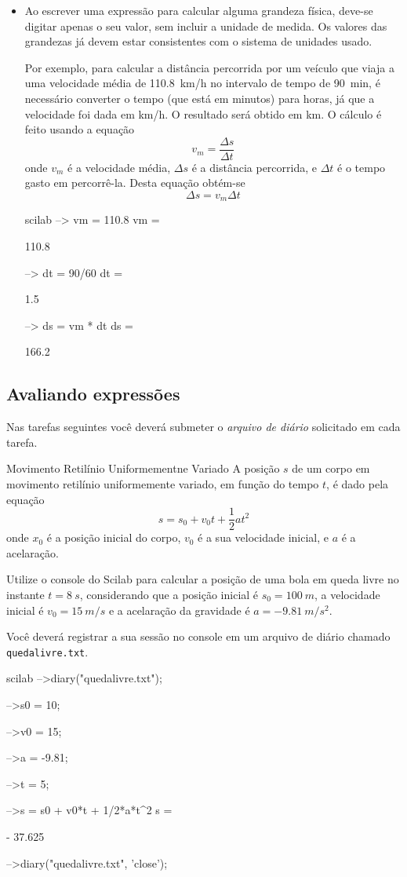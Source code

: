 \documentclass[11pt,fleqn]{practice}
\begin{document}
\begin{itemize}
  \item Ao escrever uma expressão para calcular alguma grandeza física,
  deve-se digitar apenas o seu valor, sem incluir a unidade de
  medida. Os valores das grandezas já devem estar consistentes com o
  sistema de unidades usado.

  Por exemplo, para calcular a distância percorrida por um veículo que
  viaja a uma velocidade média de \SI{110,8}{km/h} no intervalo de tempo
  de \SI{90}{min}, é necessário converter o tempo (que está em minutos)
  para horas, já que a velocidade foi dada em \si{km/h}. O resultado
  será obtido em \si{km}. O cálculo é feito usando a equação
  \[ v_m = \frac{\Delta s}{\Delta t} \]
  onde $v_m$ é a velocidade média, $\Delta s$ é a distância percorrida,
  e $\Delta t$ é o tempo gasto em percorrê-la. Desta equação obtém-se
  \[ \Delta s = v_m \Delta t \]
  \begin{lst}{scilab}
--> vm = 110.8
 vm  =
 
    110.8  
 
--> dt = 90/60
 dt  =
 
    1.5  
 
--> ds = vm * dt
 ds  =
 
    166.2  
  \end{lst}
\end{itemize}

\subsection{Avaliando expressões}

Nas tarefas seguintes você deverá submeter o \emph{arquivo de diário}
solicitado em cada tarefa.

\begin{task}[breakable,fontlower=\small]{Movimento Retilínio Uniformementne Variado}{}
  A posição $s$ de um corpo em movimento retilínio uniformemente
  variado, em função do tempo $t$, é dado pela equação
  \[ s = s_0 + v_0 t + \frac{1}{2} a t^2 \]
  onde $x_0$ é a posição inicial do corpo, $v_0$ é a sua velocidade
  inicial, e $a$ é a acelaração.

  Utilize o console do Scilab para calcular a posição de uma bola em
  queda livre no instante $t = \SI{8}{s}$, considerando que a posição
  inicial é $s_0 = \SI{100}{m}$, a velocidade inicial é $v_0 =
  \SI{15}{m/s}$ e a acelaração da gravidade é $a = \SI{-9,81}{m/s^2}$.

  Você deverá registrar a sua sessão no console em um arquivo de diário
  chamado \texttt{quedalivre.txt}.

  \tcblower
  \solution
  \begin{lst}{scilab}
-->diary("quedalivre.txt");
 
-->s0 = 10;
 
-->v0 = 15;
 
-->a = -9.81;
  
-->t = 5;
 
-->s = s0 + v0*t + 1/2*a*t^2
 s  =
 
  - 37.625  
 
-->diary("quedalivre.txt", 'close');
  \end{lst}
\end{task}
\end{document}
